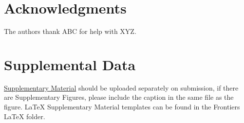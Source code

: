 \documentclass[utf8]{style/FrontiersinHarvard}
\begin{document}
\section*{Acknowledgments}
The authors thank ABC for help with XYZ.

\section*{Supplemental Data}
 \href{http://home.frontiersin.org/about/author-guidelines#SupplementaryMaterial}{Supplementary Material} should be uploaded separately on submission, if there are Supplementary Figures, please include the caption in the same file as the figure. LaTeX Supplementary Material templates can be found in the Frontiers LaTeX folder.



\end{document}
